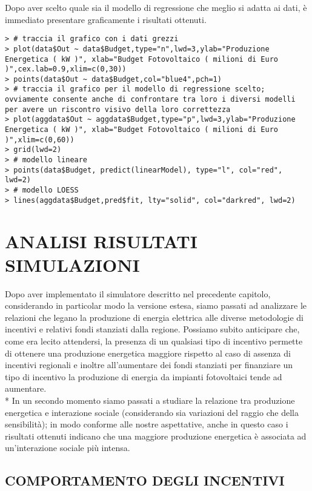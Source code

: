 \documentclass[12pt,a4paper,openright,twoside]{report}
\begin{document}
Dopo aver scelto quale sia il modello di regressione che meglio si adatta ai dati, è immediato presentare graficamente i risultati ottenuti.

\begin{lstlisting}
> # traccia il grafico con i dati grezzi
> plot(data$Out ~ data$Budget,type="n",lwd=3,ylab="Produzione Energetica ( kW )", xlab="Budget Fotovoltaico ( milioni di Euro )",cex.lab=0.9,xlim=c(0,30))
> points(data$Out ~ data$Budget,col="blue4",pch=1)
> # traccia il grafico per il modello di regressione scelto; ovviamente consente anche di confrontare tra loro i diversi modelli per avere un riscontro visivo della loro correttezza
> plot(aggdata$Out ~ aggdata$Budget,type="p",lwd=3,ylab="Produzione Energetica ( kW )", xlab="Budget Fotovoltaico ( milioni di Euro )",xlim=c(0,60)) 
> grid(lwd=2)
> # modello lineare
> points(data$Budget, predict(linearModel), type="l", col="red", lwd=2)
> # modello LOESS
> lines(aggdata$Budget,pred$fit, lty="solid", col="darkred", lwd=2)
\end{lstlisting}

\section[ANALISI RISULTATI]{ANALISI RISULTATI SIMULAZIONI}

Dopo aver implementato il simulatore descritto nel precedente capitolo, considerando in particolar modo la versione estesa, siamo passati ad analizzare le relazioni che legano la produzione di energia elettrica alle diverse metodologie di incentivi e relativi fondi stanziati dalla regione. Possiamo subito anticipare che, come era lecito attendersi, la presenza di un qualsiasi tipo di incentivo permette di ottenere una produzione energetica maggiore rispetto al caso di assenza di incentivi regionali e inoltre all'aumentare dei fondi stanziati per finanziare un tipo di incentivo la produzione di energia da impianti fotovoltaici tende ad aumentare.\\*
In un secondo momento siamo passati a studiare la relazione tra produzione energetica e interazione sociale (considerando sia variazioni del raggio che della sensibilità); in modo conforme alle nostre aspettative, anche in questo caso i risultati ottenuti indicano che una maggiore produzione energetica è associata ad un'interazione sociale più intensa.


\subsection{COMPORTAMENTO DEGLI INCENTIVI}
\end{document}

